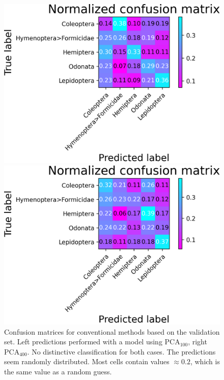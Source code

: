 \begin{figure}
    \centering
    \begin{minipage}{.45\textwidth}
    \includegraphics[width=\textwidth]{images/ridge-svm-two-stage-model-confusion.png}
    \end{minipage}
    \hfill
    \begin{minipage}{.45\textwidth}
    \includegraphics[width=\textwidth]{images/pca-400-ridge-svm-two-stage-model-confusion.png}
    \end{minipage}
    \caption{Confusion matrices for conventional methods based on the validation set. Left predictions performed with a model using $\text{PCA}_{100}$, right $\text{PCA}_{400}$. No distinctive classification for both cases. The predictions seem randomly distributed. Most cells contain values $\approx0.2$, which is the same value as a random guess.}
    \label{fig:conventional-confusions}
\end{figure}

